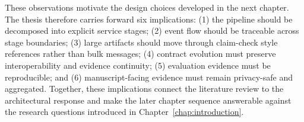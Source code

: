These observations motivate the design choices developed in the next chapter. The thesis therefore carries forward six implications: (1) the pipeline should be decomposed into explicit service stages; (2) event flow should be traceable across stage boundaries; (3) large artifacts should move through claim-check style references rather than bulk messages; (4) contract evolution must preserve interoperability and evidence continuity; (5) evaluation evidence must be reproducible; and (6) manuscript-facing evidence must remain privacy-safe and aggregated. Together, these implications connect the literature review to the architectural response and make the later chapter sequence answerable against the research questions introduced in Chapter~\ref{chap:introduction}.
